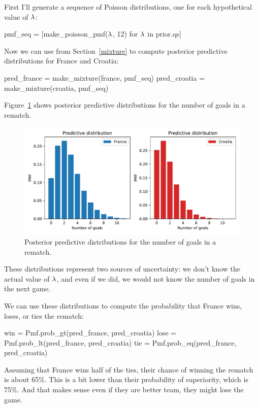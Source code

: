 \documentclass[12pt]{book}
\theoremstyle{exercise}
\begin{document}
First I'll generate a sequence of Poisson distributions, one for each hypothetical value of $\mathtt{\lambda}$:

\begin{code}
pmf_seq = [make_poisson_pmf($\mathtt{\lambda}$, 12) for $\mathtt{\lambda}$ in prior.qs]
\end{code}

Now we can use  from Section~\ref{mixture} to compute posterior predictive distributions for France and Croatia:

\begin{code}
pred_france = make_mixture(france, pmf_seq)
pred_croatia = make_mixture(croatia, pmf_seq)
\end{code}

Figure~\ref{fig07-04} shows posterior predictive distributions for the number of goals in a rematch.

\begin{figure}
\centerline{\includegraphics[width=5.5in]{figs/fig07-04.pdf}}
\caption{Posterior predictive distributions for the number of goals in a rematch.}
\label{fig07-04}
\end{figure}

These distributions represent two sources of uncertainty: we don't know the actual value of $\mathtt{\lambda}$, and even if we did, we would not know the number of goals in the next game.

We can use these distributions to compute the probability that France wins, loses, or ties the rematch:

\begin{code}
win = Pmf.prob_gt(pred_france, pred_croatia)
lose = Pmf.prob_lt(pred_france, pred_croatia)
tie = Pmf.prob_eq(pred_france, pred_croatia)
\end{code}

Assuming that France wins half of the ties, their chance of winning the rematch is about 65\%.
This is a bit lower than their probability of superiority, which is 75\%. And that makes sense even if they are better team, they might lose the game.
\end{document}
